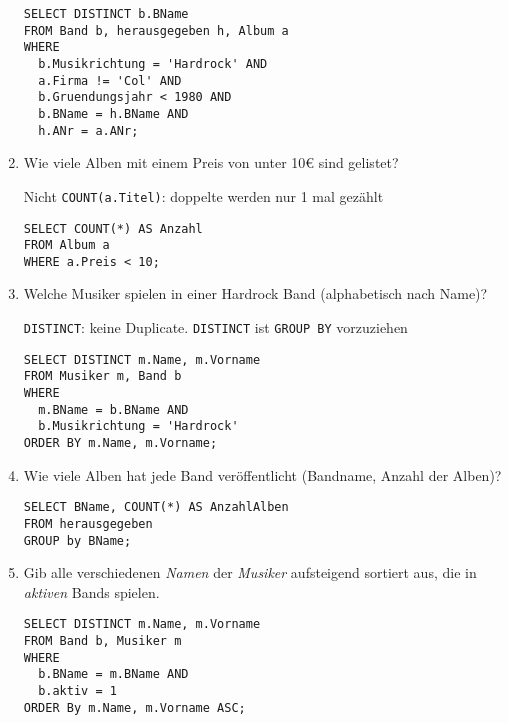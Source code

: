 \documentclass{bschlangaul-aufgabe}
\begin{document}
\begin{enumerate}
\begin{bAntwort}
\begin{verbatim}
SELECT DISTINCT b.BName
FROM Band b, herausgegeben h, Album a
WHERE
  b.Musikrichtung = 'Hardrock' AND
  a.Firma != 'Col' AND
  b.Gruendungsjahr < 1980 AND
  b.BName = h.BName AND
  h.ANr = a.ANr;
\end{verbatim}
\end{bAntwort}


\item Wie viele Alben mit einem Preis von unter 10€ sind
gelistet?

\begin{bAntwort}
Nicht \verb|COUNT(a.Titel)|: doppelte werden nur 1 mal gezählt

\begin{verbatim}
SELECT COUNT(*) AS Anzahl
FROM Album a
WHERE a.Preis < 10;
\end{verbatim}
\end{bAntwort}


\item Welche Musiker spielen in einer Hardrock Band
(alphabetisch nach Name)?

\begin{bAntwort}
\verb|DISTINCT|: keine Duplicate. \verb|DISTINCT| ist \verb|GROUP BY|
vorzuziehen

\begin{verbatim}
SELECT DISTINCT m.Name, m.Vorname
FROM Musiker m, Band b
WHERE
  m.BName = b.BName AND
  b.Musikrichtung = 'Hardrock'
ORDER BY m.Name, m.Vorname;
\end{verbatim}
\end{bAntwort}


\item Wie viele Alben hat jede Band veröffentlicht (Bandname,
Anzahl der Alben)?

\begin{bAntwort}
\begin{verbatim}
SELECT BName, COUNT(*) AS AnzahlAlben
FROM herausgegeben
GROUP by BName;
\end{verbatim}
\end{bAntwort}


\item Gib alle verschiedenen \emph{Namen} der \emph{Musiker} aufsteigend
sortiert aus, die in \emph{aktiven} Bands spielen.

\begin{bAntwort}
\begin{verbatim}
SELECT DISTINCT m.Name, m.Vorname
FROM Band b, Musiker m
WHERE
  b.BName = m.BName AND
  b.aktiv = 1
ORDER By m.Name, m.Vorname ASC;
\end{verbatim}
\end{bAntwort}


\end{enumerate}
\end{document}
